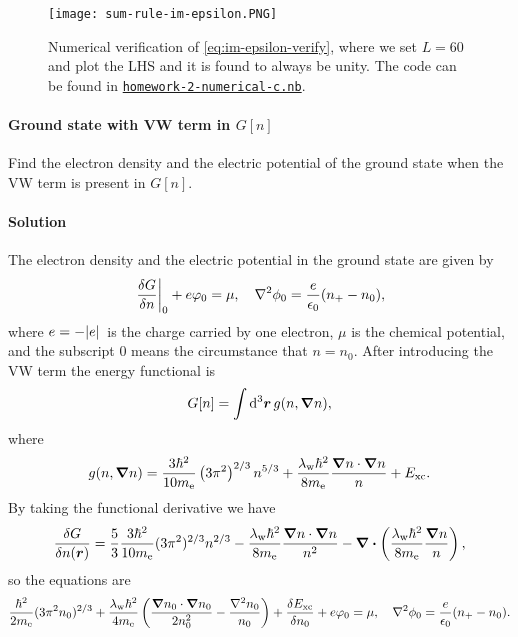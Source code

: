 \documentclass[hyperref, a4paper]{article}
\begin{document}
\begin{figure}
    \centering
    \texttt{[image: sum-rule-im-epsilon.PNG]}
    \caption{Numerical verification of \eqref{eq:im-epsilon-verify}, where we set $L=60$ and plot the LHS and it is found to always be unity. The code can be found in \href{./homework-2-numerical-c.nb}{\texttt{homework-2-numerical-c.nb}}.}
    \label{fig:im-epsilon-plot}
\end{figure}

\paragraph{}

\paragraph{Ground state with VW term in $G[n]$} Find the electron density and the electric potential of the ground state when the VW term is present in $G[n]$.

\paragraph{Solution} The electron density and the electric potential in the ground state are given by 
\begin{equation}
    \eval{\fdv{G}{n}}_0 + e \varphi_0 = \mu, \quad \laplacian \phi_0 = \frac{e}{\epsilon_0} (n_+ - n_0),
\end{equation}
where $e = - \abs*{e}$ is the charge carried by one electron, $\mu$ is the chemical potential, and the subscript 0 means the circumstance that $n = n_0$.
After introducing the VW term the energy functional is 
\begin{equation}
    G[n] = \int \dd[3]{\vb*{r}} g(n, \grad{n}), 
\end{equation}
where 
\begin{equation}
    g(n, \grad{n}) = \frac{3 \hbar^{2}}{10 m_\text{e}}\left(3 \pi^{2}\right)^{2 / 3} n^{5 / 3}+\frac{\lambda_{\mathrm{w}} \hbar^{2}}{8 m_\text{e}} \frac{\grad n \cdot \grad n}{n}+E_{\mathrm{xc}}.
\end{equation}
By taking the functional derivative we have 
\[
    \fdv{G}{n(\vb*{r})} = \frac{5}{3} \frac{3 \hbar^2}{10 m_\text{e}} (3\pi^2)^{2/3} n^{2/3} - \frac{\lambda_\text{w} \hbar^2}{8 m_\text{e}} \frac{\grad{n} \cdot \grad{n}}{n^2} - \div\left( \frac{\lambda_{\mathrm{w}} \hbar^{2}}{8 m_\text{e}} \frac{\grad{n}}{n} \right) ,
\]
so the equations are 
\begin{equation}
    \frac{\hbar^2}{2 m_\text{e}} (3\pi^2 n_0)^{2/3} + \frac{\lambda_{\mathrm{w}} \hbar^{2}}{4 m_\text{e}}\left( \frac{\grad n_0 \cdot \grad n_0}{2 n_0^{2}}-\frac{\nabla^{2} n_0}{n_0} \right)+\frac{\delta E_{\mathrm{xc}}}{\delta n_0} + e \varphi_0 = \mu, \quad \laplacian \phi_0 = \frac{e}{\epsilon_0} (n_+ - n_0).
\end{equation}
\end{document}
